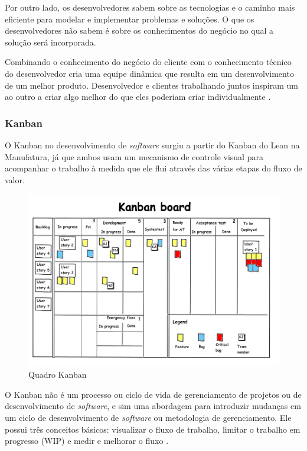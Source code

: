 Por outro lado, os desenvolvedores sabem sobre as tecnologias e o caminho mais eficiente para modelar e implementar problemas e soluções. O que os desenvolvedores não sabem é sobre os conhecimentos do negócio no qual a solução será incorporada. 

Combinando o conhecimento do negócio do cliente com o conhecimento técnico do desenvolvedor cria uma equipe dinâmica que resulta em um desenvolvimento de um melhor produto. Desenvolvedor e clientes trabalhando juntos inspiram um ao outro a criar algo melhor do que eles poderiam criar individualmente \cite{hibbs2009}.


\subsubsection[Kanban]{Kanban}

O Kanban no desenvolvimento de \textit{software} surgiu a partir do Kanban do Lean na Manufatura, já que ambos usam um mecanismo de controle visual para acompanhar o trabalho à medida que ele flui através das várias etapas do fluxo de valor. 

\begin{figure}[H]
		\centering
		\label{fig05}
			\includegraphics[scale=0.7]{figuras/kanban.png}
		\caption{Quadro Kanban \cite{kanban}}
\end{figure}

O Kanban não é um processo ou ciclo de vida de gerenciamento de projetos ou de desenvolvimento de \textit{software}, e sim uma abordagem para introduzir mudanças em um ciclo de desenvolvimento de \textit{software} ou metodologia de gerenciamento. Ele possui três conceitos básicos: visualizar o fluxo de trabalho, limitar o trabalho em progresso (WIP) e medir e melhorar o fluxo \cite{kniberg2009}. 

